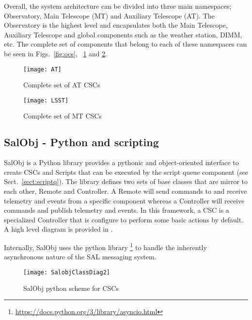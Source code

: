 Overall, the system architecture can be divided into three main namespaces; Observatory, Main Telescope (MT) and Auxiliary Telescope (AT). The Observatory is the highest level and encapsulates both the Main Telescope, Auxiliary Telescope and global components such as the weather station, DIMM, etc. The complete set of components that belong to each of these namespaces can be seen in Figs.~\ref{fig:ocs}, ~\ref{fig:atcscs} and \ref{fig:mtcscs}.

\begin{figure}
\begin{center}
\texttt{[image: AT]}
\caption{Complete set of AT CSCs\label{fig:atcscs}}
\end{center}
\end{figure}

\begin{figure}
\begin{center}
\texttt{[image: LSST]}
\caption{Complete set of MT CSCs\label{fig:mtcscs}}
\end{center}
\end{figure}

\subsection{SalObj - Python and scripting }\label{sect:salobj}
SalObj is a Python library provides a pythonic and object-oriented interface to create CSCs and Scripts that can be executed by the script queue component (see Sect.~\ref{sect:scriptq}). The library defines two sets of base classes that are mirror to each other, Remote and Controller. A Remote will send commands to and receive telemetry and events from a specific component whereas a Controller will receive commands and publish telemetry and events. In this framework, a CSC is a specialized Controller that is configure to perform some basic actions by default. A high level diagram is provided in .

Internally, SalObj uses the python library \asyncio\footnote{\url{https://docs.python.org/3/library/asyncio.html}} to handle the inherently asynchronous nature of the SAL messaging system.

\begin{figure}
\begin{center}
\texttt{[image: SalobjClassDiag2]}
\caption{SalObj python scheme for  CSCs\label{fig:salobj}}
\end{center}
\end{figure}

